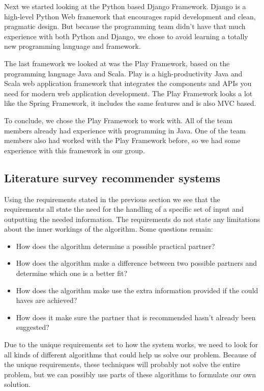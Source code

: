 Next we started looking at the Python based Django Framework\cite{django}.
Django is a high-level Python Web framework that encourages rapid development and clean, pragmatic design.
But because the programming team didn't have that much experience with both Python and Django, we chose to avoid learning a totally new programming language and framework.

The last framework we looked at was the Play Framework\cite{play}, based on the programming language Java and Scala.
Play is a high-productivity Java and Scala web application framework that integrates the components and APIs you need for modern web application development.
The Play Framework looks a lot like the Spring Framework, it includes the same features and is also MVC based.

To conclude, we chose the Play Framework to work with. All of the team members already had experience with programming in Java. One of the team members also had worked with the Play Framework before, so we had some experience with this framework in our group.

\subsection*{Literature survey recommender systems}
Using the requirements stated in the previous section we see that the requirements all state the need for the handling of a specific set of input and outputting the needed information.
The requirements do not state any limitations about the inner workings of the algorithm.
Some questions remain:
\begin{itemize}
\item How does the algorithm determine a possible practical partner?
\item How does the algorithm make a difference between two possible partners and determine which one is a better fit?
\item How does the algorithm make use the extra information provided if the could haves are achieved?
\item How does it make sure the partner that is recommended hasn't already been suggested?
\end{itemize}
Due to the unique requirements set to how the system works, we need to look for all kinds of different algorithms that could help us solve our problem.
Because of the unique requirements, these techniques will probably not solve the entire problem, but we can possibly use parts of these algorithms to formulate our own solution.

